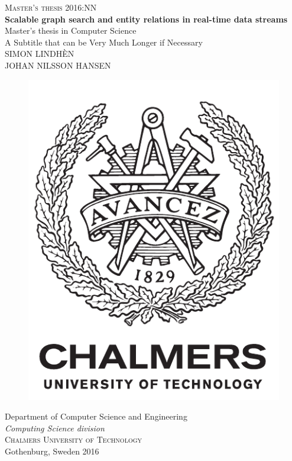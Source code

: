\newpage
\restoregeometry
\thispagestyle{empty}
\mbox{}


\newpage
\thispagestyle{empty}
\begin{center}
	\textsc{\large Master's thesis 2016:NN}\\[4cm]		%
	\textbf{\large Scalable graph search and entity relations in real-time data streams}\\[0.5cm]
Master's thesis in Computer Science \\[1cm]
	{\large A Subtitle that can be Very Much Longer if Necessary}\\[1cm]
	{\large SIMON LINDHÈN\\JOHAN NILSSON HANSEN}
	
	\vfill	
	\begin{figure}[H]
	\centering
	\includegraphics[width=0.2\pdfpagewidth]{figure/auxiliary/logo_eng.pdf} \\	
	\end{figure}	\vspace{5mm}	
	
	Department of Computer Science and Engineering \\
	\emph{Computing Science division}\\
	\textsc{Chalmers University of Technology} \\
	Gothenburg, Sweden 2016 \\
\end{center}


